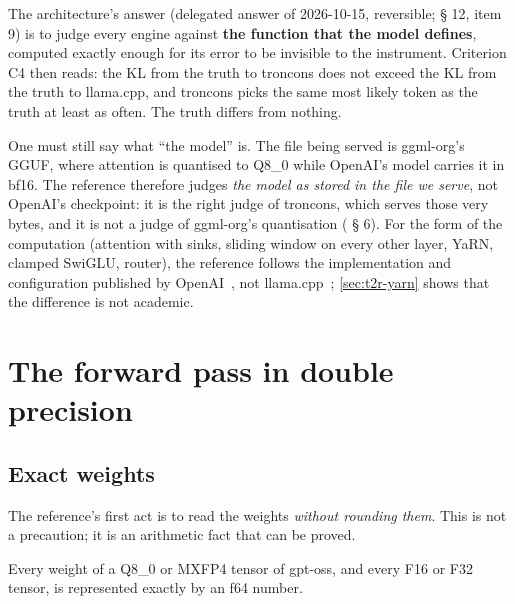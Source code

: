 The architecture's answer (delegated answer of 2026-10-15, reversible;  § 12, item 9) is to judge every engine against \textbf{the function that the model defines}, computed exactly enough for its error to be invisible to the instrument. Criterion C4 then reads: the KL from the truth to troncons does not exceed the KL from the truth to llama.cpp, and troncons picks the same most likely token as the truth at least as often. The truth differs from nothing.

One must still say what \enquote{the model} is. The file being served is ggml-org's GGUF, where attention is quantised to Q8\_0 while OpenAI's model carries it in bf16. The reference therefore judges \emph{the model as stored in the file we serve}, not OpenAI's checkpoint: it is the right judge of troncons, which serves those very bytes, and it is not a judge of ggml-org's quantisation ( § 6). For the form of the computation (attention with sinks, sliding window on every other layer, YaRN, clamped SwiGLU, router), the reference follows the implementation and configuration published by OpenAI~\cite{openai2025gptossref,openai2025gptoss20bconfig}, not llama.cpp~\cite{ggml2026llamacppb11515}; \cref{sec:t2r-yarn} shows that the difference is not academic.

\section{The forward pass in double precision}\label{sec:t2r-passe}

\subsection{Exact weights}\label{sec:t2r-poids}

The reference's first act is to read the weights \emph{without rounding them}. This is not a precaution; it is an arithmetic fact that can be proved.

\begin{lemme}\label{lem:t2r-exact}
Every weight of a Q8\_0 or MXFP4 tensor of gpt-oss, and every F16 or F32 tensor, is represented exactly by an f64 number.
\end{lemme}

